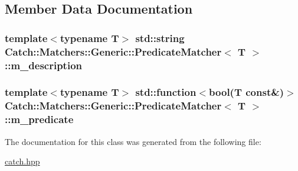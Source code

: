 \subsection{Member Data Documentation}
\hypertarget{class_catch_1_1_matchers_1_1_generic_1_1_predicate_matcher_a7736732e65a93e4e1f889804d043407e}{
\subsubsection[{m\-\_\-description}]{\setlength{\rightskip}{0pt plus 5cm}template$<$typename T$>$ std\-::string {\bf Catch\-::\-Matchers\-::\-Generic\-::\-Predicate\-Matcher}$<$ T $>$\-::m\-\_\-description\hspace{0.3cm}{\ttfamily [private]}}}\label{class_catch_1_1_matchers_1_1_generic_1_1_predicate_matcher_a7736732e65a93e4e1f889804d043407e}
\hypertarget{class_catch_1_1_matchers_1_1_generic_1_1_predicate_matcher_ab7f09e9f96fb9d794e1fc699497ec3e0}{
\subsubsection[{m\-\_\-predicate}]{\setlength{\rightskip}{0pt plus 5cm}template$<$typename T$>$ std\-::function$<$bool(T const\&)$>$ {\bf Catch\-::\-Matchers\-::\-Generic\-::\-Predicate\-Matcher}$<$ T $>$\-::m\-\_\-predicate\hspace{0.3cm}{\ttfamily [private]}}}\label{class_catch_1_1_matchers_1_1_generic_1_1_predicate_matcher_ab7f09e9f96fb9d794e1fc699497ec3e0}


The documentation for this class was generated from the following file\-:\begin{DoxyCompactItemize}
\item 
\hyperlink{catch_8hpp}{catch.\-hpp}\end{DoxyCompactItemize}

